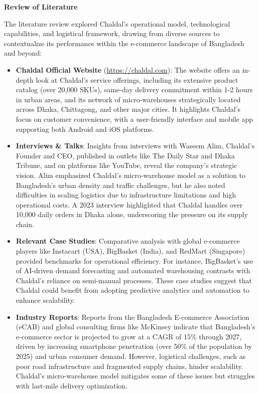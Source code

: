 \documentclass[12pt,a4paper]{article}
\begin{document}
\vspace{.4em}
{\large\bfseries Review of Literature}

The literature review explored Chaldal’s operational model, technological capabilities, and logistical framework, drawing from diverse sources to contextualize its performance within the e-commerce landscape of Bangladesh and beyond:
\begin{itemize}
    \item \textbf{Chaldal Official Website} (\url{https://chaldal.com}): The website offers an in-depth look at Chaldal’s service offerings, including its extensive product catalog (over 20,000 SKUs), same-day delivery commitment within 1-2 hours in urban areas, and its network of micro-warehouses strategically located across Dhaka, Chittagong, and other major cities. It highlights Chaldal’s focus on customer convenience, with a user-friendly interface and mobile app supporting both Android and iOS platforms.
    
    \item \textbf{Interviews \& Talks}: Insights from interviews with Waseem Alim, Chaldal’s Founder and CEO, published in outlets like The Daily Star and Dhaka Tribune, and on platforms like YouTube, reveal the company’s strategic vision. Alim emphasized Chaldal’s micro-warehouse model as a solution to Bangladesh’s urban density and traffic challenges, but he also noted difficulties in scaling logistics due to infrastructure limitations and high operational costs. A 2023 interview highlighted that Chaldal handles over 10,000 daily orders in Dhaka alone, underscoring the pressure on its supply chain.
    
    \item \textbf{Relevant Case Studies}: Comparative analysis with global e-commerce players like Instacart (USA), BigBasket (India), and RedMart (Singapore) provided benchmarks for operational efficiency. For instance, BigBasket’s use of AI-driven demand forecasting and automated warehousing contrasts with Chaldal’s reliance on semi-manual processes. These case studies suggest that Chaldal could benefit from adopting predictive analytics and automation to enhance scalability.
    
    \item \textbf{Industry Reports}: Reports from the Bangladesh E-commerce Association (eCAB) and global consulting firms like McKinsey indicate that Bangladesh’s e-commerce sector is projected to grow at a CAGR of 15\% through 2027, driven by increasing smartphone penetration (over 50\% of the population by 2025) and urban consumer demand. However, logistical challenges, such as poor road infrastructure and fragmented supply chains, hinder scalability. Chaldal’s micro-warehouse model mitigates some of these issues but struggles with last-mile delivery optimization.


\end{itemize}
\end{document}
